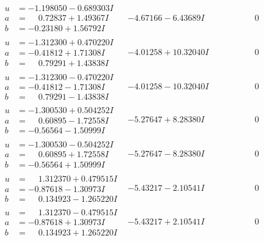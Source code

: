 \documentclass[1p]{elsarticle_modified}
\theoremstyle{definition}
\begin{document}
$$\begin{array}{c|c|c}
\begin{aligned}
u &= -1.198050 - 0.689303 I \\
a &= \phantom{-}0.72837 + 1.49367 I \\
b &= -0.23180 + 1.56792 I\end{aligned}
 & -4.67166 - 6.43689 I & \phantom{-0.000000 } 0 \\ \hline\begin{aligned}
u &= -1.312300 + 0.470220 I \\
a &= -0.41812 + 1.71308 I \\
b &= \phantom{-}0.79291 + 1.43838 I\end{aligned}
 & -4.01258 + 10.32040 I & \phantom{-0.000000 } 0 \\ \hline\begin{aligned}
u &= -1.312300 - 0.470220 I \\
a &= -0.41812 - 1.71308 I \\
b &= \phantom{-}0.79291 - 1.43838 I\end{aligned}
 & -4.01258 - 10.32040 I & \phantom{-0.000000 } 0 \\ \hline\begin{aligned}
u &= -1.300530 + 0.504252 I \\
a &= \phantom{-}0.60895 - 1.72558 I \\
b &= -0.56564 - 1.50999 I\end{aligned}
 & -5.27647 + 8.28380 I & \phantom{-0.000000 } 0 \\ \hline\begin{aligned}
u &= -1.300530 - 0.504252 I \\
a &= \phantom{-}0.60895 + 1.72558 I \\
b &= -0.56564 + 1.50999 I\end{aligned}
 & -5.27647 - 8.28380 I & \phantom{-0.000000 } 0 \\ \hline\begin{aligned}
u &= \phantom{-}1.312370 + 0.479515 I \\
a &= -0.87618 - 1.30973 I \\
b &= \phantom{-}0.134923 - 1.265220 I\end{aligned}
 & -5.43217 - 2.10541 I & \phantom{-0.000000 } 0 \\ \hline\begin{aligned}
u &= \phantom{-}1.312370 - 0.479515 I \\
a &= -0.87618 + 1.30973 I \\
b &= \phantom{-}0.134923 + 1.265220 I\end{aligned}
 & -5.43217 + 2.10541 I & \phantom{-0.000000 } 0 \\ \hline\begin{aligned}

\end{aligned}
\end{array}$$
\end{document}
